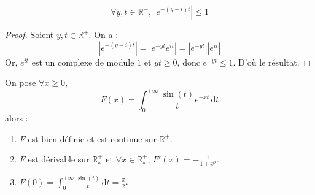 





  \begin{lemma}
    \label{integrale-de-dirichlet-1}
    \[ \forall y, t \in \mathbb{R}^+, \, |e^{-(y-i)t}| \leq 1 \]
  \end{lemma}

  \begin{proof}
    Soient $y, t \in \mathbb{R}^+$. On a :
    \[ |e^{-(y-i)t}| = |e^{-yt} e^{it}| = |e^{-yt}| |e^{it}| \]
    Or, $e^{it}$ est un complexe de module $1$ et $yt \geq 0$, donc $e^{-yt} \leq 1$. D'où le résultat.
  \end{proof}


  \begin{theorem}
    On pose $\forall x \geq 0$,
    \[ F(x) = \int_0^{+\infty} \frac{\sin(t)}{t} e^{-xt} \, \mathrm{d}t \]
    alors :
    \begin{enumerate}[label={\bfseries(\roman*)}]
      \item $F$ est bien définie et est continue sur $\mathbb{R}^+$.
      \item $F$ est dérivable sur $\mathbb{R}^+_*$ et $\forall x \in \mathbb{R}^+_*$, $F'(x) = -\frac{1}{1+x^2}$.
      \item $F(0) = \int_0^{+\infty} \frac{\sin(t)}{t} \, \mathrm{d}t = \frac{\pi}{2}$.
    \end{enumerate}
  \end{theorem}


